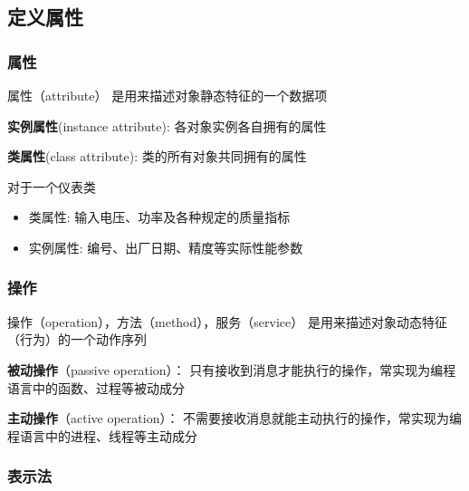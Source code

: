 \documentclass[compress]{beamer}
\begin{document}
\subsection{定义属性}

\begin{frame}
  \frametitle{属性}
  \begin{block} {属性（attribute）}
    是用来描述对象静态特征的一个数据项

    \textbf{实例属性}(instance attribute): 各对象实例各自拥有的属性

    \textbf{类属性}(class attribute): 类的所有对象共同拥有的属性

  \end{block}


  \begin{example}
  对于一个仪表类
  \begin{itemize}
    \item 类属性: 输入电压、功率及各种规定的质量指标
    \item 实例属性: 编号、出厂日期、精度等实际性能参数
  \end{itemize}
\end{example}

\end{frame}

\begin{frame}
  \frametitle{操作}
  \begin{block} {操作（operation），方法（method），服务（service） }
    是用来描述对象动态特征（行为）的一个动作序列 
  \end{block}

  \textbf{被动操作}（passive operation）：
    只有接收到消息才能执行的操作，常实现为编程语言中的函数、过程等被动成分

    \textbf{主动操作}（active operation）：
    不需要接收消息就能主动执行的操作，常实现为编程语言中的进程、线程等主动成分  
\end{frame}

\begin{frame}
  \frametitle{表示法}
\end{frame}
\end{document}
